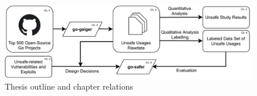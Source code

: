 \begin{figure}[htp!]
    \includegraphics[width=\textwidth]{assets/figures/chapter1/outline1.pdf}
    \caption{Thesis outline and chapter relations}
    \label{fig:outline}
\end{figure}
